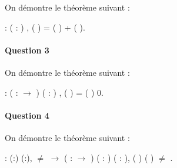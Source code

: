 \documentclass{report}
\begin{document}
On démontre le théorème suivant :

\noindent\begin{coqdoccode}
\coqdocemptyline
\coqdocnoindent
{}  : \coqdockw{\ensuremath{\forall}} ( : )  ,
  (  ) = (  ) + (  ).\coqdoceol
\coqdocemptyline
\end{coqdoccode}

\paragraph{Question 3}

On démontre le théorème suivant :

\noindent\begin{coqdoccode}
\coqdocemptyline
\coqdocnoindent
{}  : \coqdockw{\ensuremath{\forall}} ( :  \ensuremath{\rightarrow} ) ( : ) ,
\coqdocnoindent
{}  (  ) =  ( )      0.\coqdoceol
\coqdocemptyline
\end{coqdoccode}

\paragraph{Question 4}

On démontre le théorème suivant :

\noindent\begin{coqdoccode}
\coqdocemptyline
\coqdocnoindent
{}  : \coqdockw{\ensuremath{\forall}} (:) (:), \ensuremath{\not=} \ensuremath{\rightarrow} \coqdoctac{\ensuremath{\exists}} ( :  \ensuremath{\rightarrow} ) ( : ) ( :  ),
\coqdocnoindent
{} ( ) (  ) \ensuremath{\not=}   .\coqdoceol
\coqdocemptyline
\end{coqdoccode}
\end{document}
